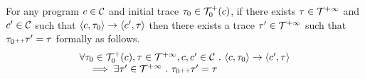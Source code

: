   \begin{lemma}
    For any program $c \in \mathcal{C}$ and initial trace $\mathtt{\tau}_0 \in \mathcal{T}^{+}_0(c)$,
    if there exists $\mathtt{\tau} \in \mathcal{T}^{+\infty}$ and $c' \in \mathcal{C} $ such that $\langle c, \mathtt{\tau}_0 \rangle \rightarrow \langle c', \mathtt{\tau} \rangle $
    then there exists a trace $\mathtt{\tau}' \in \mathcal{T}^{+\infty}$ such that $\mathtt{\tau}_0 {\scriptscriptstyle ++} \mathtt{\tau}' = \mathtt{\tau}$ formally as follows.
    \[
      \begin{array}{l}
      \forall \mathtt{\tau}_0 \in \mathcal{T}^{+}_0(c), \mathtt{\tau} \in \mathcal{T}^{+\infty}, c, c' \in \mathcal{C} ~.~
        \langle c, \mathtt{\tau}_0 \rangle \rightarrow \langle c', \mathtt{\tau} \rangle 
      \\ \quad
      \implies \exists \mathtt{\tau}' \in \mathcal{T}^{+\infty} ~.~ \mathtt{\tau}_0 {\scriptscriptstyle ++} \mathtt{\tau}' = \mathtt{\tau} 
      \end{array}
    \]
\end{lemma}
